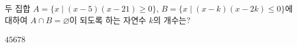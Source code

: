 두 집합 $A=\{x \mid (x-5)(x-21)\ge 0\}$, $B=\{x \mid (x-k)(x-2k)\le 0\}$에 대하여 $A\cap B=\varnothing$이 되도록 하는 자연수 $k$의 개수는?
\begin{choices32}{$4$}{$5$}{$6$}{$7$}{$8$}\end{choices32}
